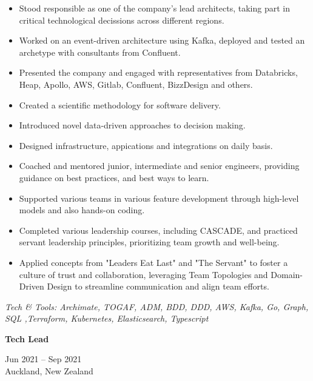 \documentclass[10pt,a4paper,ragged2e,withhyper]{altacv}
\renewcommand{\cvevent}[4]{%
  \textbf{#1} %
  \hfill %
  \begin{minipage}[t]{.5\linewidth}
    \raggedleft %
    \small#3 %
    \\ %
    #4 %
  \end{minipage}
  \vspace{\baselineskip} %
}
\begin{document}
\begin{itemize}
\item Stood responsible as one of the company’s lead architects, taking part in critical technological decissions across
different regions.
\item Worked on an event-driven architecture using Kafka, deployed and tested an archetype with consultants from Confluent. 
\item Presented the company and engaged with representatives from Databricks, Heap, Apollo, AWS, Gitlab, Confluent, BizzDesign and others.
\item Created a scientific methodology for software delivery. 
\item Introduced novel data-driven approaches to decision making. 
\item Designed infrastructure, appications and integrations on daily basis. 
\item Coached and mentored junior, intermediate and senior engineers, providing guidance on best practices, and best ways to learn. 
\item Supported various teams in various feature development through high-level models and also hands-on coding.
\item Completed various leadership courses, including CASCADE, and practiced servant leadership principles, prioritizing team growth and well-being.
\item Applied concepts from "Leaders Eat Last" and "The Servant" to foster a culture of trust and collaboration, leveraging Team Topologies and Domain-Driven Design to streamline communication and align team efforts.
\end{itemize}

\vspace{0.5cm}

\textit{Tech \& Tools: Archimate, TOGAF, ADM, BDD, DDD, AWS, Kafka, Go, Graph, SQL ,Terraform, Kubernetes, Elasticsearch, Typescript}

\divider


\cvevent{Tech Lead}{Idexx Laboratories}{Jun 2021 -- Sep 2021}{Auckland, New Zealand}
\end{document}
